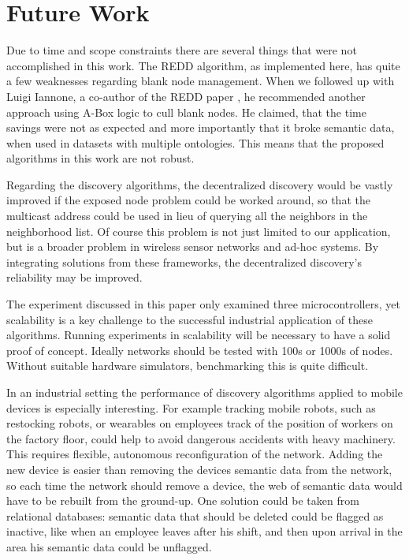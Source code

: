 \section{Future Work}

Due to time and scope constraints there are several things that were not accomplished in this work. The REDD algorithm, as implemented here, has quite a few weaknesses regarding blank node management. When we followed up with Luigi Iannone, a co-author of the REDD paper \cite{Esposito.2005}, he recommended another approach using A-Box logic to cull blank nodes. He claimed, that the time savings were not as expected and more importantly that it broke semantic data, when used in datasets with multiple ontologies. This means that the proposed algorithms in this work are not robust.

Regarding the discovery algorithms, the decentralized discovery would be vastly improved if the exposed node problem could be worked around, so that the multicast address could be used in lieu of querying all the neighbors in the neighborhood list. Of course this problem is not just limited to our application, but is a broader problem in wireless sensor networks and ad-hoc systems. By integrating solutions from these frameworks, the decentralized discovery's reliability may be improved. 

The experiment discussed in this paper only examined three microcontrollers, yet scalability is a key challenge to the successful industrial application of these algorithms. Running experiments in scalability will be necessary to have a solid proof of concept. Ideally networks should be tested with 100s or 1000s of nodes. Without suitable hardware simulators, benchmarking this is quite difficult.

In an industrial setting the performance of discovery algorithms applied to mobile devices is especially interesting. For example tracking mobile robots, such as restocking robots, or wearables on employees track of the position of workers on the factory floor, could help to avoid dangerous accidents with heavy machinery. This requires flexible, autonomous reconfiguration of the network. Adding the new device is easier than removing the devices semantic data from the network, so each time the network should remove a device, the web of semantic data would have to be rebuilt from the ground-up. One solution could be taken from relational databases: semantic data that should be deleted could be flagged as inactive, like when an employee leaves after his shift, and then upon arrival in the area his semantic data could be unflagged.
